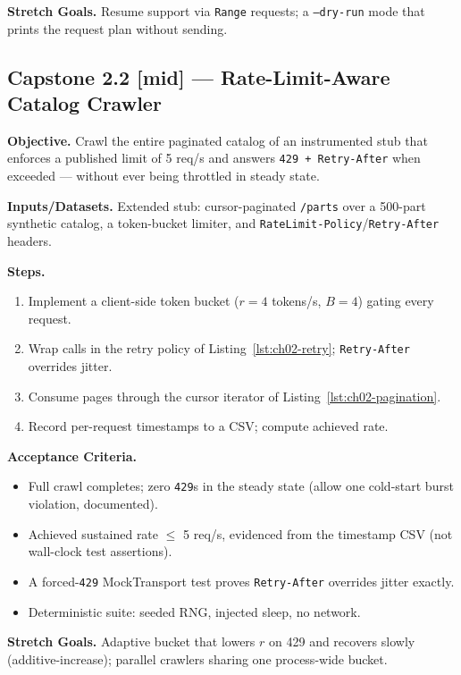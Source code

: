 \textbf{Stretch Goals.} Resume support via \texttt{Range} requests; a
\texttt{--dry-run} mode that prints the request plan without sending.

\subsection{Capstone 2.2 [mid] --- Rate-Limit-Aware Catalog Crawler}

\textbf{Objective.} Crawl the entire paginated catalog of an instrumented
stub that enforces a published limit of 5 req/s and answers
\texttt{429 + Retry-After} when exceeded --- without ever being throttled in
steady state.

\textbf{Inputs/Datasets.} Extended stub: cursor-paginated \texttt{/parts}
over a 500-part synthetic catalog, a token-bucket limiter, and
\texttt{RateLimit-Policy}/\texttt{Retry-After} headers.

\textbf{Steps.}
\begin{enumerate}
  \item Implement a client-side token bucket ($r = 4$ tokens/s, $B = 4$)
        gating every request.
  \item Wrap calls in the retry policy of Listing~\ref{lst:ch02-retry};
        \texttt{Retry-After} overrides jitter.
  \item Consume pages through the cursor iterator of
        Listing~\ref{lst:ch02-pagination}.
  \item Record per-request timestamps to a CSV; compute achieved rate.
\end{enumerate}

\textbf{Acceptance Criteria.}
\begin{itemize}
  \item[$\square$] Full crawl completes; zero \texttt{429}s in the steady
        state (allow one cold-start burst violation, documented).
  \item[$\square$] Achieved sustained rate $\le$ 5 req/s, evidenced from the
        timestamp CSV (not wall-clock test assertions).
  \item[$\square$] A forced-\texttt{429} MockTransport test proves
        \texttt{Retry-After} overrides jitter exactly.
  \item[$\square$] Deterministic suite: seeded RNG, injected sleep, no
        network.
\end{itemize}

\textbf{Stretch Goals.} Adaptive bucket that lowers $r$ on 429 and recovers
slowly (additive-increase); parallel crawlers sharing one process-wide
bucket.

